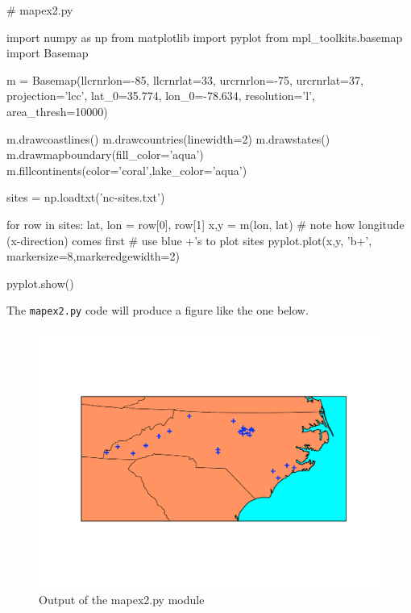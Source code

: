 \begin{python}
# mapex2.py

import numpy as np
from matplotlib import pyplot
from mpl_toolkits.basemap import Basemap

m = Basemap(llcrnrlon=-85, llcrnrlat=33, urcrnrlon=-75,
  urcrnrlat=37, projection='lcc', lat_0=35.774, lon_0=-78.634,
  resolution='l', area_thresh=10000)

m.drawcoastlines()
m.drawcountries(linewidth=2)
m.drawstates()
m.drawmapboundary(fill_color='aqua')
m.fillcontinents(color='coral',lake_color='aqua')

sites = np.loadtxt('nc-sites.txt')

for row in sites:
    lat, lon = row[0], row[1]
    x,y = m(lon, lat) # note how longitude (x-direction) comes first
    # use blue +'s to plot sites
    pyplot.plot(x,y, 'b+', markersize=8,markeredgewidth=2) 

pyplot.show()    
\end{python}
The \lstinline!mapex2.py! code will produce a figure like the one below.

\begin{figure}[htbp]
\centering
\includegraphics[width=0.6\columnwidth]{./figures/hands-on3/mapfig.pdf}
\caption{Output of the mapex2.py module}
\end{figure}
